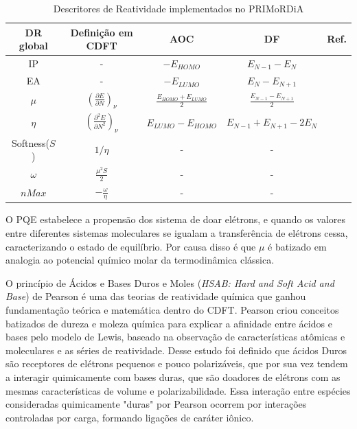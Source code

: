 \documentclass[a4paper,11pt]{refart}
\begin{document}
\hspace*{-\leftmarginwidth}
\begin{minipage}{\fullwidth}
	\begin{table}[H]
		\centering	
		\caption{Descritores de Reatividade implementados no PRIMoRDiA}
		\begin{tabular}{c|c|c|c|c}
			\toprule
			DR global & Definição em CDFT  & AOC & DF & Ref. \\
			\midrule
			IP & -  & $- E_{HOMO}$ & $E_{N-1}-E_{N}$  &  \\  \hline	
			EA & -  & $- E_{LUMO}$ & $E_{N}-E_{N+1}$ & \\ \hline	
			$\mu$  & $\left(\frac{\partial E}{\partial N} \right)_\nu$  & $\frac{E_{HOMO} + E_{LUMO}}{2}$ &$\frac{E_{N-1}-E_{N+1}}{2}$ & \cite{ribeiro2017atlas}\\ \hline			
			$\eta$  & $\left(\frac{\partial ^2  E}{\partial N ^2} \right)_\nu$ &$E_{LUMO} - E_{HOMO}$ &$E_{N-1}+E_{N+1}-2E_{N}$ & \cite{parr1983absolute}\\ \hline
			Softness($S$)  & $1/\eta$  & - & -  & \cite{parr1983absolute} \\ \hline
			$\omega$  & $\frac{\mu^2S}{2}$  &-  &-  & \cite{cedillo2012local} \\ \hline
			$nMax$  & $-\frac{\omega}{\eta} $ & - & - & \cite{cedillo2012local}  \\ 
			\bottomrule
		\end{tabular} 
		\label{tab1}	
	\end{table}	
\end{minipage}


O PQE estabelece a propensão dos sistema de doar elétrons, e quando os valores entre diferentes sistemas moleculares se igualam a transferência de elétrons cessa, caracterizando o estado de equilíbrio\cite{parr1983absolute}. Por causa disso é que $\mu$ é batizado em analogia ao potencial químico molar da termodinâmica clássica. 

O princípio de Ácidos e Bases Duros e Moles  (\textit{HSAB: Hard and Soft Acid and Base}) de Pearson\cite{pearson1987recent} é uma das teorias de reatividade química que ganhou fundamentação teórica e matemática dentro do CDFT. Pearson criou conceitos batizados de dureza e moleza química para explicar a afinidade entre ácidos e bases pelo modelo de Lewis, baseado na observação de características atômicas e moleculares e as séries de reatividade\cite{Pearson1963}. Desse estudo foi definido que ácidos Duros são receptores de elétrons pequenos e pouco polarizáveis, que por sua vez tendem a interagir quimicamente com bases duras, que são doadores de elétrons com as mesmas características de volume e polarizabilidade. Essa interação entre espécies consideradas quimicamente "duras" por Pearson ocorrem por interações controladas por carga, formando ligações de caráter iônico. 
\end{document}
